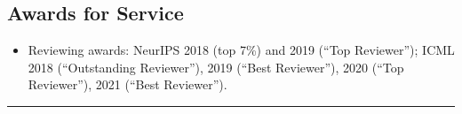 \documentclass[10pt]{article}
\begin{document}
\subsection{Awards for Service} %
\begin{itemize}
  \item[] Reviewing awards: NeurIPS 2018 (top 7\%) and 2019 (``Top Reviewer''); ICML 2018 (``Outstanding Reviewer''), 2019 (``Best Reviewer''), 2020 (``Top Reviewer''), 2021 (``Best Reviewer'').
\end{itemize}

%



\newpage
{}\bigskip\rule{3.5in}{0mm}
\iftoggle{ubcformat}
{
\parbox[t]{2in}{{\bf Date:} \today}\parbox[t]{1in}{Initials: D.J.S.} \\
\noindent\parbox[t]{.5in}{\mbox{}}\parbox[t]{3.04in}{{\bf SURNAME:}
  Sutherland}\parbox[t]{3.2in}{{\bf FIRST NAME:} Danica}
\\\rule{3.54in}{0mm}\parbox[t]{3.2in}{{\bf MIDDLE NAME:} Jane}
\\[5mm]
\setcounter{section}{0}
\vspace{12pt}
}{}
\end{document}
